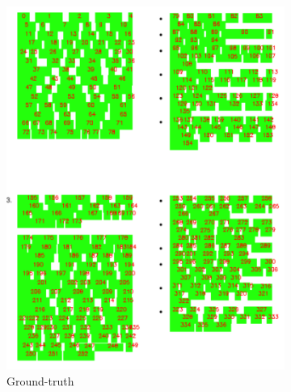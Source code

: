 \begin{figure}
  \centering
  \small
      \begin{subfigure}[b]{0.5\textwidth}
        \includegraphics[width=\textwidth]{images/chapter4/gold_multicolumn.pdf}
        \caption{Ground-truth}
      \end{subfigure}
      \begin{subfigure}[b]{0.5\textwidth}

\end{subfigure}
\end{figure}
